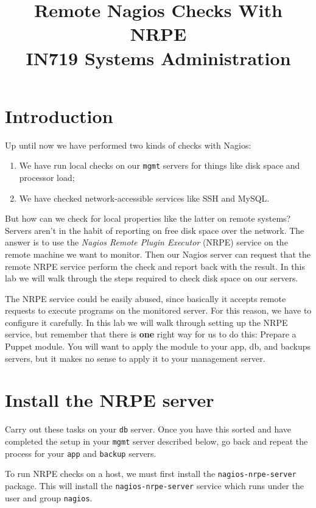 \documentclass{article}   	%
\title{Remote Nagios Checks With NRPE\\ IN719 Systems Administration}
\date{}							%
\begin{document}
\maketitle

\section*{Introduction}
Up until now we have performed two kinds of checks with Nagios:

\begin{enumerate}
  \item We have run local checks on our \texttt{mgmt} servers for things like disk space and processor load;
  \item We have checked network-accessible services like SSH and MySQL.
\end{enumerate}

But how can we check for local properties like the latter on remote systems?  Servers aren't in the habit of reporting on free disk space over the network.  The answer is to use the \emph{Nagios Remote Plugin Executor} (NRPE) service on the remote machine we want to monitor.  Then our Nagios server can request that the remote NRPE service perform the check and report back with the result.  In this lab we will walk through the steps required to check disk space on our servers.

The NRPE service could be easily abused, since basically it accepts remote requests to execute programs on the monitored server.  For this reason, we have to configure it carefully. In this lab we will walk through setting up the NRPE service, but remember that there is \textbf{one} right way for us to do this: Prepare a Puppet module. You will want to apply the module to your app, db, and backups servers, but it makes no sense to apply it to your management server.

\section{Install the NRPE server} 
Carry out these tasks on your \texttt{db} server. Once you have this sorted and have completed the setup in your \texttt{mgmt} server described below, go back and repeat the process for your \texttt{app} and \texttt{backup} servers.

To run NRPE checks on a host, we must first install the \texttt{nagios-nrpe-server} package. This will install the \texttt{nagios-nrpe-server} service which runs under the user and group \texttt{nagios}.
\end{document}
